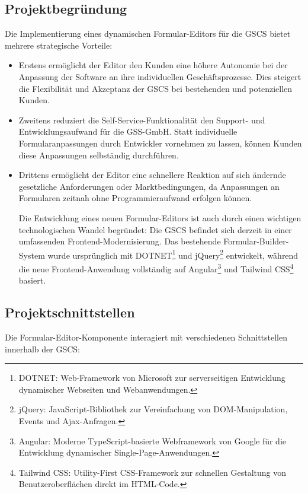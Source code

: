 \documentclass[a4paper,11pt]{article}
\begin{document}
\subsection{Projektbegründung}
Die Implementierung eines dynamischen Formular-Editors für die GSCS bietet mehrere strategische Vorteile:
\begin{itemize}
\item Erstens ermöglicht der Editor den Kunden eine höhere Autonomie bei der Anpassung der Software an ihre individuellen Geschäftsprozesse. Dies steigert die Flexibilität und Akzeptanz der GSCS bei bestehenden und potenziellen Kunden.

\item Zweitens reduziert die Self-Service-Funktionalität den Support- und Entwicklungsaufwand für die GSS-GmbH. Statt individuelle Formularanpassungen durch Entwickler vornehmen zu lassen, können Kunden diese Anpassungen selbständig durchführen.

\item Drittens ermöglicht der Editor eine schnellere Reaktion auf sich ändernde gesetzliche Anforderungen oder Marktbedingungen, da Anpassungen an Formularen zeitnah ohne Programmieraufwand erfolgen können.

\noindent Die Entwicklung eines neuen Formular-Editors ist auch durch einen wichtigen technologischen Wandel begründet: Die GSCS befindet sich derzeit in einer umfassenden Frontend-Modernisierung. Das bestehende Formular-Builder-System wurde ursprünglich mit DOTNET\footnote{DOTNET: Web-Framework von Microsoft zur serverseitigen Entwicklung dynamischer Webseiten und Webanwendungen.} und jQuery\footnote{jQuery: JavaScript-Bibliothek zur Vereinfachung von DOM-Manipulation, Events und Ajax-Anfragen.} entwickelt, während die neue Frontend-Anwendung vollständig auf Angular\footnote{Angular: Moderne TypeScript-basierte Webframework von Google für die Entwicklung dynamischer Single-Page-Anwendungen.} und Tailwind CSS\footnote{Tailwind CSS: Utility-First CSS-Framework zur schnellen Gestaltung von Benutzeroberflächen direkt im HTML-Code.} basiert.

\end{itemize}
\subsection{Projektschnittstellen}

Die Formular-Editor-Komponente interagiert mit verschiedenen Schnittstellen innerhalb der GSCS:
\end{document}
